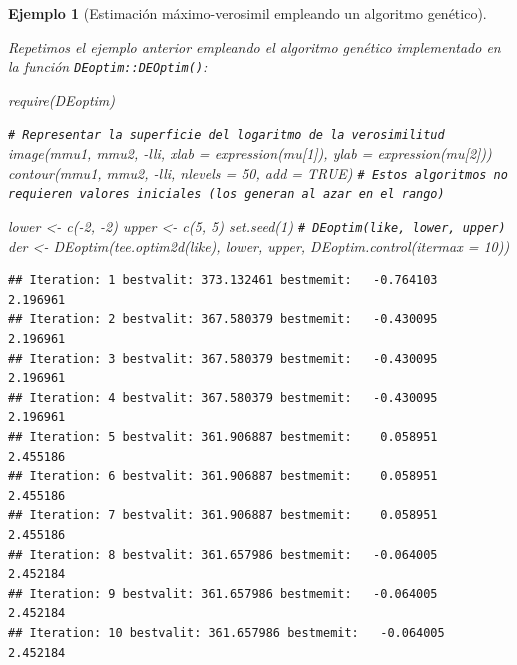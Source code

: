 \documentclass[
]{book}
\newenvironment{Shaded}{\begin{snugshade}}{\end{snugshade}}
\newcommand{\AttributeTok}[1]{\textcolor[rgb]{0.77,0.63,0.00}{#1}}
\newcommand{\CommentTok}[1]{\textcolor[rgb]{0.56,0.35,0.01}{\textit{#1}}}
\newcommand{\ConstantTok}[1]{\textcolor[rgb]{0.00,0.00,0.00}{#1}}
\newcommand{\DecValTok}[1]{\textcolor[rgb]{0.00,0.00,0.81}{#1}}
\newcommand{\FunctionTok}[1]{\textcolor[rgb]{0.00,0.00,0.00}{#1}}
\newcommand{\NormalTok}[1]{#1}
\newcommand{\OtherTok}[1]{\textcolor[rgb]{0.56,0.35,0.01}{#1}}
\newcommand{\SpecialCharTok}[1]{\textcolor[rgb]{0.00,0.00,0.00}{#1}}
\theoremstyle{break}
\newtheorem{example}{Ejemplo}[chapter]
\theoremstyle{nonumberplain}
\renewcommand{\CommentTok}[1]{\textcolor[rgb]{0.41,0.41,0.41}{\texttt{#1}}}
\begin{document}
\begin{example}[Estimación máximo-verosimil empleando un algoritmo genético]
\protect\hypertarget{exm:mv-DEoptim}{}\label{exm:mv-DEoptim}

Repetimos el ejemplo anterior empleando el algoritmo genético implementado en la función \texttt{DEoptim::DEOptim()}:

\begin{Shaded}
\begin{Highlighting}[]
\FunctionTok{require}\NormalTok{(DEoptim)}

\CommentTok{\# Representar la superficie del logaritmo de la verosimilitud}
\FunctionTok{image}\NormalTok{(mmu1, mmu2, }\SpecialCharTok{{-}}\NormalTok{lli, }\AttributeTok{xlab =} \FunctionTok{expression}\NormalTok{(mu[}\DecValTok{1}\NormalTok{]), }\AttributeTok{ylab =} \FunctionTok{expression}\NormalTok{(mu[}\DecValTok{2}\NormalTok{]))}
\FunctionTok{contour}\NormalTok{(mmu1, mmu2, }\SpecialCharTok{{-}}\NormalTok{lli, }\AttributeTok{nlevels =} \DecValTok{50}\NormalTok{, }\AttributeTok{add =} \ConstantTok{TRUE}\NormalTok{)}
\CommentTok{\# Estos algoritmos no requieren valores iniciales (los generan al azar en el rango)}

\NormalTok{lower }\OtherTok{\textless{}{-}} \FunctionTok{c}\NormalTok{(}\SpecialCharTok{{-}}\DecValTok{2}\NormalTok{, }\SpecialCharTok{{-}}\DecValTok{2}\NormalTok{)}
\NormalTok{upper }\OtherTok{\textless{}{-}} \FunctionTok{c}\NormalTok{(}\DecValTok{5}\NormalTok{, }\DecValTok{5}\NormalTok{)}
\FunctionTok{set.seed}\NormalTok{(}\DecValTok{1}\NormalTok{)}
\CommentTok{\# DEoptim(like, lower, upper)}
\NormalTok{der }\OtherTok{\textless{}{-}} \FunctionTok{DEoptim}\NormalTok{(}\FunctionTok{tee.optim2d}\NormalTok{(like), lower, upper, }\FunctionTok{DEoptim.control}\NormalTok{(}\AttributeTok{itermax =} \DecValTok{10}\NormalTok{))}
\end{Highlighting}
\end{Shaded}

\begin{verbatim}
## Iteration: 1 bestvalit: 373.132461 bestmemit:   -0.764103    2.196961
## Iteration: 2 bestvalit: 367.580379 bestmemit:   -0.430095    2.196961
## Iteration: 3 bestvalit: 367.580379 bestmemit:   -0.430095    2.196961
## Iteration: 4 bestvalit: 367.580379 bestmemit:   -0.430095    2.196961
## Iteration: 5 bestvalit: 361.906887 bestmemit:    0.058951    2.455186
## Iteration: 6 bestvalit: 361.906887 bestmemit:    0.058951    2.455186
## Iteration: 7 bestvalit: 361.906887 bestmemit:    0.058951    2.455186
## Iteration: 8 bestvalit: 361.657986 bestmemit:   -0.064005    2.452184
## Iteration: 9 bestvalit: 361.657986 bestmemit:   -0.064005    2.452184
## Iteration: 10 bestvalit: 361.657986 bestmemit:   -0.064005    2.452184
\end{verbatim}


\end{example}
\end{document}
